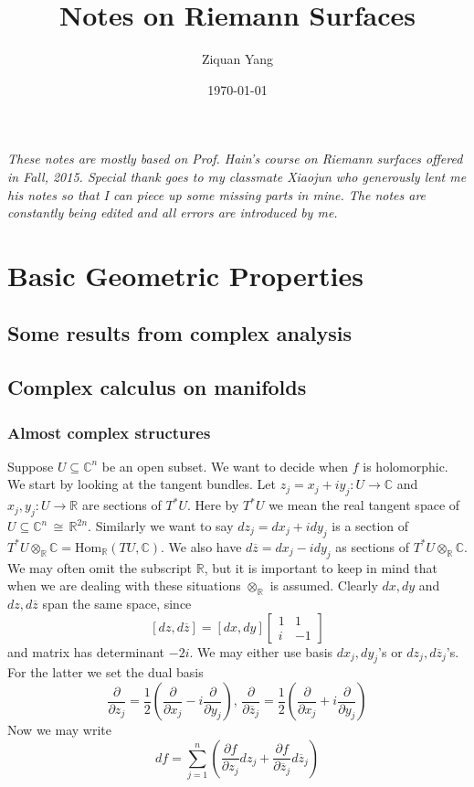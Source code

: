 \documentclass[12pt]{article}
\theoremstyle{plain}
\theoremstyle{definition}
\newcommand{\IC}{\mathbb{C}}
\newcommand{\IR}{\mathbb{R}}
\newcommand{\Hom}{\mathrm{Hom}}
\newcommand\iso{{\, \cong \,}}
\newcommand\tensor{{\otimes}}
\newcommand{\<}{\langle}
\renewcommand{\>}{\rangle}
\newcommand{\p}{\partial}
\newcommand{\half}{\frac{1}{2}}
\newcommand{\bz}{\overline{z}}
\newcommand{\ddzj}{\frac{\p}{\p z_j}}
\newcommand{\ddbzj}{\frac{\p}{\p \bz_j}}
\newcommand{\ddxj}{\frac{\p}{\p x_j}}
\newcommand{\ddyj}{\frac{\p}{\p y_j}}
\begin{document}
%

\title{Notes on Riemann Surfaces}
\author{Ziquan Yang}


\date{\today}

\maketitle

\textsl{These notes are mostly based on Prof. Hain's course on Riemann surfaces offered in Fall, 2015. Special thank goes to my classmate Xiaojun who generously lent me his notes so that I can piece up some missing parts in mine. The notes are constantly being edited and all errors are introduced by me.}
\tableofcontents

\setcounter{section}{0}


\section{Basic Geometric Properties}

\subsection{Some results from complex analysis}

\subsection{Complex calculus on manifolds}

\subsubsection{Almost complex structures}
Suppose $U \subseteq \IC^n$ be an open subset. We want to decide when $f$ is holomorphic. We start by looking at the tangent bundles. Let $z_j = x_j + iy_j : U \to \IC$ and $x_j, y_j : U \to \IR$ are sections of $T^* U$. Here by $T^* U$ we mean the real tangent space of $U \subseteq \IC^n \iso \IR^{2n}$. Similarly we want to say $dz_j = dx_j + i dy_j$ is a section of $T^* U \tensor_\IR \IC = \Hom_\IR(TU, \IC)$. We also have $d\bz = dx_j - i dy_j$ as sections of $T^* U \tensor_\IR \IC$. We may often omit the subscript $\IR$, but it is important to keep in mind that when we are dealing with these situations $\tensor_\IR$ is assumed. Clearly $dx, dy$ and $dz, d\bz$ span the same space, since
$$ [dz, d\bz] = [dx, dy] \begin{bmatrix}
1 & 1 \\ i & -1 
\end{bmatrix}  $$
and matrix has determinant $-2i$. We may either use basis $dx_j, dy_j$'s or $dz_j, d\bz_j$'s. For the latter we set the dual basis
$$ \ddzj = \half( \ddxj - i \ddyj ), \, \ddbzj = \half (\ddxj + i \ddyj) $$
Now we may write 
$$ df = \sum_{j = 1}^n (\frac{\p f}{\p z_j} dz_j + \frac{\p f}{\p \bz_j} d
\bz_j) $$
\end{document}
